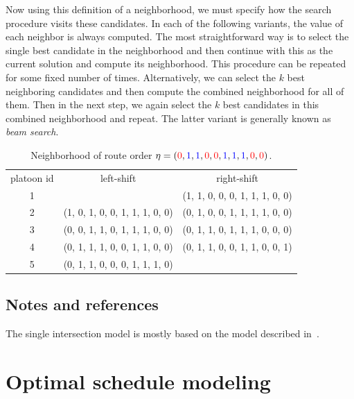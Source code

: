 \documentclass[a4paper]{report}
\theoremstyle{definition}
\theoremstyle{plain}
\begin{document}
Now using this definition of a neighborhood, we must specify how the search
procedure visits these candidates.
In each of the following variants, the value of each neighbor is always computed.
%
The most straightforward way is to select the single best candidate in the
neighborhood and then continue with this as the current solution and compute its
neighborhood. This procedure can be repeated for some fixed number of times.
Alternatively, we can select the $k$ best neighboring candidates and then
compute the combined neighborhood for all of them. Then in the next step, we
again select the $k$ best candidates in this combined neighborhood and repeat.
The latter variant is generally known as \textit{beam search}.

\newcommand*{\1}{{\color{blue}1}}%
\newcommand*{\0}{{\color{red}0}}%

\begin{table}
\caption{Neighborhood of route order $\eta = (\0, \1, \1, \0, \0, \1, \1, \1, \0, \0)$.}
\label{tab:local_search}
\begin{center}
\begin{tabular}{c|c|c}
  platoon id  & left-shift & right-shift \\
  1 &  & (\1, \1, \0, \0, \0, \1, \1, \1, \0, \0) \\
  2 & (\1, \0, \1, \0, \0, \1, \1, \1, \0, \0) & (\0, \1, \0, \0, \1, \1, \1, \1, \0, \0) \\
  3 & (\0, \0, \1, \1, \0, \1, \1, \1, \0, \0) & (\0, \1, \1, \0, \1, \1, \1, \0, \0, \0) \\
  4 & (\0, \1, \1, \1, \0, \0, \1, \1, \0, \0) & (\0, \1, \1, \0, \0, \1, \1, \0, \0, \1) \\
  5 & (\0, \1, \1, \0, \0, \0, \1, \1, \1, \0) &
\end{tabular}
\end{center}
\end{table}

\section{Notes and references}

The single intersection model is mostly based on the model described
in~\cite[Chapter 3]{hultOptimizationBasedCoordination2019}.


\chapter{Optimal schedule modeling}\label{chap:single-learning}
\end{document}
